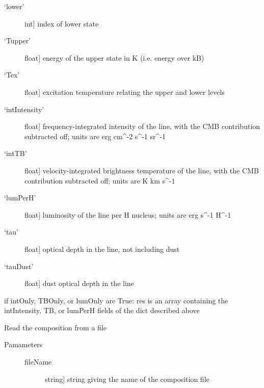\documentclass[letterpaper,10pt,english]{sphinxmanual}
\begin{document}
\begin{fulllineitems}
\begin{fulllineitems}
\begin{description}
\begin{description}
\item[{`lower'}] \leavevmode{[}int{]}
index of lower state

\item[{`Tupper'}] \leavevmode{[}float{]}
energy of the upper state in K (i.e. energy over kB)

\item[{`Tex'}] \leavevmode{[}float{]}
excitation temperature relating the upper and lower levels

\item[{`intIntensity'}] \leavevmode{[}float{]}
frequency-integrated intensity of the line, with the CMB
contribution subtracted off; units are erg cm\textasciicircum{}-2 s\textasciicircum{}-1 sr\textasciicircum{}-1

\item[{`intTB'}] \leavevmode{[}float{]}
velocity-integrated brightness temperature of the line,
with the CMB contribution subtracted off; units are K km
s\textasciicircum{}-1

\item[{`lumPerH'}] \leavevmode{[}float{]}
luminosity of the line per H nucleus; units are erg s\textasciicircum{}-1
H\textasciicircum{}-1

\item[{`tau'}] \leavevmode{[}float{]}
optical depth in the line, not including dust

\item[{`tauDust'}] \leavevmode{[}float{]}
dust optical depth in the line

\end{description}

\end{description}

if intOnly, TBOnly, or lumOnly are True: res is an array
containing the intIntensity, TB, or lumPerH fields of the dict
described above

\end{fulllineitems}


\begin{fulllineitems}
\label{fulldoc:despotic.cloud.read}
Read the composition from a file
\begin{description}
\item[{Pamameters}] \leavevmode\begin{description}
\item[{fileName}] \leavevmode{[}string{]}
string giving the name of the composition file


\end{description}
\end{description}
\end{fulllineitems}
\end{fulllineitems}
\end{document}
